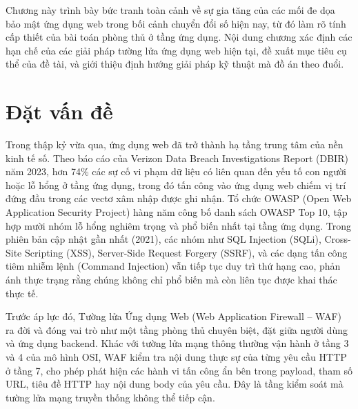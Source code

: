 \documentclass[../DoAn.tex]{subfiles}
\begin{document}
Chương này trình bày bức tranh toàn cảnh về sự gia tăng của các mối đe dọa
bảo mật ứng dụng web trong bối cảnh chuyển đổi số hiện nay, từ đó làm rõ tính
cấp thiết của bài toán phòng thủ ở tầng ứng dụng. Nội dung chương xác định
các hạn chế của các giải pháp tường lửa ứng dụng web hiện tại, đề xuất mục tiêu
cụ thể của đề tài, và giới thiệu định hướng giải pháp kỹ thuật mà đồ án theo đuổi.

\section{Đặt vấn đề}
\label{section:1.1}

Trong thập kỷ vừa qua, ứng dụng web đã trở thành hạ tầng trung tâm của nền
kinh tế số. Theo báo cáo của Verizon Data Breach Investigations Report (DBIR)
năm 2023, hơn 74\% các sự cố vi phạm dữ liệu có liên quan đến yếu tố con
người hoặc lỗ hổng ở tầng ứng dụng, trong đó tấn công vào ứng dụng web chiếm
vị trí đứng đầu trong các vectơ xâm nhập được ghi nhận. Tổ chức OWASP (Open
Web Application Security Project) hàng năm công bố danh sách OWASP Top 10,
tập hợp mười nhóm lỗ hổng nghiêm trọng và phổ biến nhất tại tầng ứng dụng.
Trong phiên bản cập nhật gần nhất (2021), các nhóm như SQL Injection (SQLi),
Cross-Site Scripting (XSS), Server-Side Request Forgery (SSRF), và các dạng
tấn công tiêm nhiễm lệnh (Command Injection) vẫn tiếp tục duy trì thứ hạng cao,
phản ánh thực trạng rằng chúng không chỉ phổ biến mà còn liên tục được khai thác
thực tế.

Trước áp lực đó, Tường lửa Ứng dụng Web (Web Application Firewall -- WAF)
ra đời và đóng vai trò như một tầng phòng thủ chuyên biệt, đặt giữa người dùng
và ứng dụng backend. Khác với tường lửa mạng thông thường vận hành ở tầng
3 và 4 của mô hình OSI, WAF kiểm tra nội dung thực sự của từng yêu cầu HTTP
ở tầng 7, cho phép phát hiện các hành vi tấn công ẩn bên trong payload, tham số
URL, tiêu đề HTTP hay nội dung body của yêu cầu. Đây là tầng kiểm soát mà
tường lửa mạng truyền thống không thể tiếp cận.
\end{document}
